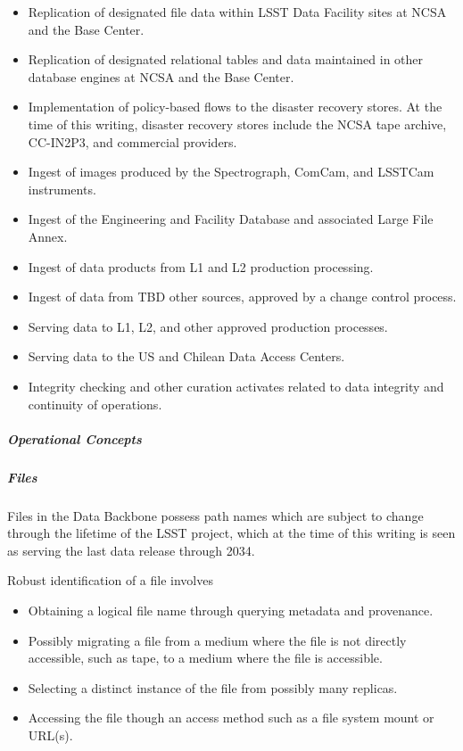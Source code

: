 \begin{itemize}

\item Replication of designated file data within LSST Data Facility sites
at NCSA and the Base Center.

\item Replication of designated relational tables and data maintained
in other database engines at NCSA and the Base Center.

\item Implementation of policy-based flows to the disaster recovery stores. At
the time of this writing, disaster recovery stores include the NCSA tape archive, CC-IN2P3,
and commercial providers.

\item Ingest of images produced by the Spectrograph, ComCam, and LSSTCam instruments.

\item Ingest of the Engineering and Facility Database and associated Large File Annex.

\item Ingest of data products from L1 and L2 production processing.

\item Ingest of data from TBD other sources, approved by a change control process.

\item Serving data to L1, L2, and other approved production processes.

\item Serving data to the US and Chilean Data Access Centers.

\item Integrity checking and other curation activates related to data integrity and
continuity of operations.

\end{itemize}

\subparagraph{Operational Concepts}

\subparagraph{Files}

Files in the Data Backbone possess path names which are subject to change
through the lifetime of the LSST project, which at the time of this writing is
seen as serving the last data release through 2034.

Robust identification of a file involves
\begin{itemize}
\item Obtaining a logical file name through querying metadata and provenance.
\item Possibly migrating a file from a medium where the file is not directly accessible,
such as tape, to a medium where the file is accessible.
\item Selecting a distinct instance of the file from possibly many replicas.
\item Accessing the file though an access method such as a file system mount or URL(s).
\end{itemize}

